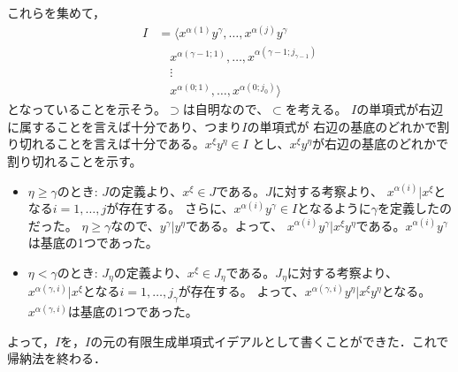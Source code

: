\documentclass[9pt]{ltjsarticle}
\begin{document}
\begin{myproof}
これらを集めて，
\begin{align}
 I &= \langle x^{\alpha(1)}y^\gamma ,\dots, x^{\alpha(j)}y^\gamma \\
 &\quad x^{\alpha(\gamma-1;1)},\dots, x^{\alpha(\gamma-1;j_{\gamma-1})} \\
 &\quad \vdots\\
 & \quad x^{\alpha(0;1)} ,\dots, x^{\alpha(0;j_{0})} \rangle
\end{align}
となっていることを示そう。$\supset$は自明なので、$\subset$を考える。
$I$の単項式が右辺に属することを言えば十分であり、つまり$I$の単項式が
右辺の基底のどれかで割り切れることを言えば十分である。$x^{\xi}y^\eta\in I$
とし、$x^\xi y^\eta$が右辺の基底のどれかで割り切れることを示す。
\begin{itemize}
  \item $\eta \ge \gamma$のとき:
  $J$の定義より、$x^\xi \in J$である。$J$に対する考察より、
  $x^{\alpha(i)}|x^\xi$となる$i=1,\dots,j$が存在する。
  さらに、$x^{\alpha(i)}y^\gamma \in I$となるように$\gamma$を定義したのだった。
  $\eta \ge \gamma$なので、$y^\gamma | y^\eta$である。よって、
  $x^{\alpha(i)}y^\gamma | x^\xi y^\eta$である。$x^{\alpha(i)}y^\gamma$は基底の1つであった。
  \item $\eta < \gamma$のとき:
  $J_\eta$の定義より、$x^\xi \in J_\eta$である。$J_\eta$に対する考察より、
  $x^{\alpha(\gamma,i)} | x^\xi $となる$i=1,\dots, j_\gamma$が存在する。
  よって、$x^{\alpha(\gamma,i)}y^\eta | x^\xi y^\eta$となる。$x^{\alpha(\gamma,i)}$は基底の1つであった。
  \end{itemize}
よって，$I$を，$I$の元の有限生成単項式イデアルとして書くことができた．これで帰納法を終わる．


\end{myproof}
\end{document}
